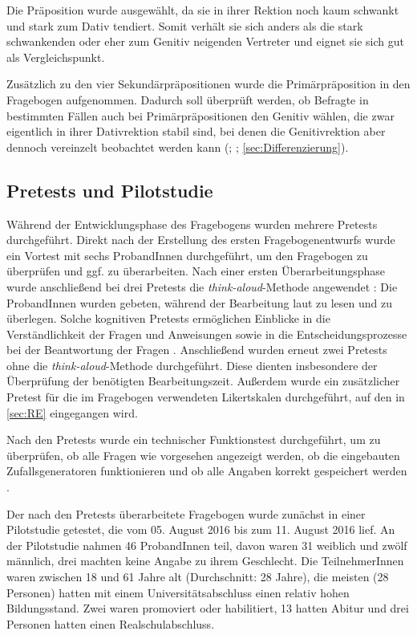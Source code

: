 Die Präposition  wurde ausgewählt, da sie in ihrer Rektion noch kaum schwankt und stark zum Dativ tendiert. Somit verhält sie sich anders als die stark schwankenden oder eher zum Genitiv neigenden Vertreter und eignet sie sich gut als Vergleichspunkt. 

Zusätzlich zu den vier Sekundärpräpositionen wurde die Primärpräposition  in den Fragebogen aufgenommen. Dadurch soll überprüft werden, ob Befragte in bestimmten Fällen auch bei Primärpräpositionen den Genitiv wählen, die zwar eigentlich in ihrer Dativrektion stabil sind, bei denen die Genitivrektion aber dennoch vereinzelt beobachtet werden kann (\citealp[s.][211]{DiMeola2009}; \citeyear[227]{DiMeola2011}; \autoref{sec:Differenzierung}). 
\subsection{Pretests und Pilotstudie}
\label{sec:PretestPilot}
Während der Entwicklungsphase des Fragebogens wurden mehrere Pretests durchgeführt. Direkt nach der Erstellung des ersten Fragebogenentwurfs wurde ein Vortest mit sechs ProbandInnen durchgeführt, um den Fragebogen zu überprüfen und ggf. zu überarbeiten. Nach einer ersten Überarbeitungsphase wurde anschließend bei drei Pretests die \textit{think-aloud}-Methode angewendet \citep[s.][194]{Porst2014}: Die ProbandInnen wurden gebeten, während der Bearbeitung laut zu lesen und zu überlegen. Solche kognitiven Pretests ermöglichen Einblicke in die Verständlichkeit der Fragen und Anweisungen sowie in die Entscheidungsprozesse bei der Beantwortung der Fragen \citep[s.][195--196]{Porst2014}. Anschließend wurden erneut zwei Pretests ohne die \textit{think-aloud}-Methode durchgeführt. Diese dienten insbesondere der Überprüfung der benötigten Bearbeitungszeit. Außerdem wurde ein zusätzlicher Pretest für die im Fragebogen verwendeten Likertskalen durchgeführt, auf den in \autoref{sec:RE} eingegangen wird.

Nach den Pretests wurde ein technischer Funktionstest durchgeführt, um zu überprüfen, ob alle Fragen wie vorgesehen angezeigt werden, ob die eingebauten Zufallsgeneratoren funktionieren und ob alle Angaben korrekt gespeichert werden \citep[s.][]{Leiner2014}. 

Der nach den Pretests überarbeitete Fragebogen wurde zunächst in einer Pilotstudie getestet, die vom 05. August 2016 bis zum 11. August 2016 lief. An der Pilotstudie nahmen 46 ProbandInnen teil, davon waren 31 weiblich und zwölf männlich, drei machten keine Angabe zu ihrem Geschlecht. Die TeilnehmerInnen waren zwischen 18 und 61 Jahre alt (Durchschnitt: 28 Jahre), die meisten (28 Personen) hatten mit einem Universitätsabschluss einen relativ hohen Bildungsstand. Zwei waren promoviert oder habilitiert, 13 hatten Abitur und drei Personen hatten einen Realschulabschluss. 

